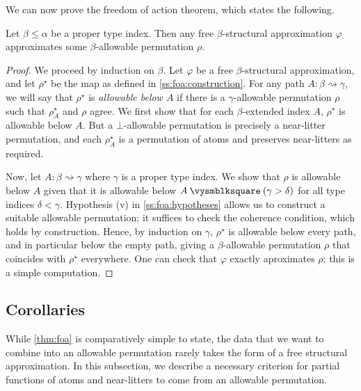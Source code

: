 We can now prove the freedom of action theorem, which states the following.

\begin{theorem*}
    Let \( \beta \leq \alpha \) be a proper type index.
    Then any free \( \beta \)-structural approximation \( \varphi \) approximates some \( \beta \)-allowable permutation \( \rho \).
\end{theorem*}
\begin{proof}
    We proceed by induction on \( \beta \).
    Let \( \varphi \) be a free \( \beta \)-structural approximation, and let \( \rho^\star \) be the map as defined in \cref{ss:foa:construction}.
    For any path \( A : \beta \rightsquigarrow \gamma \), we will say that \( \rho^\star \) is \emph{allowable below \( A \)} if there is a \( \gamma \)-allowable permutation \( \rho \) such that \( \rho^\star_A \) and \( \rho \) agree.
    We first show that for each \( \beta \)-extended index \( A \), \( \rho^\star \) is allowable below \( A \).
    But a \( \bot \)-allowable permutation is precisely a near-litter permutation, and each \( \rho^\star_A \) is a permutation of atoms and preserves near-litters as required.

    Now, let \( A : \beta \rightsquigarrow \gamma \) where \( \gamma \) is a proper type index.
    We show that \( \rho \) is allowable below \( A \) given that it is allowable below \( A \pcomp (\gamma > \delta) \) for all type indices \( \delta < \gamma \).
    Hypothesis (v) in \cref{ss:foa:hypotheses} allows us to construct a suitable allowable permutation; it suffices to check the coherence condition, which holds by construction.
    Hence, by induction on \( \gamma \), \( \rho^\star \) is allowable below every path, and in particular below the empty path, giving a \( \beta \)-allowable permutation \( \rho \) that coincides with \( \rho^\star \) everywhere.
    One can check that \( \varphi \) exactly aproximates \( \rho \); this is a simple computation.
\end{proof}

\subsection{Corollaries}

While \cref{thm:foa} is comparatively simple to state, the data that we want to combine into an allowable permutation rarely takes the form of a free structural approximation.
In this subsection, we describe a necessary criterion for partial functions of atoms and near-litters to come from an allowable permutation.

